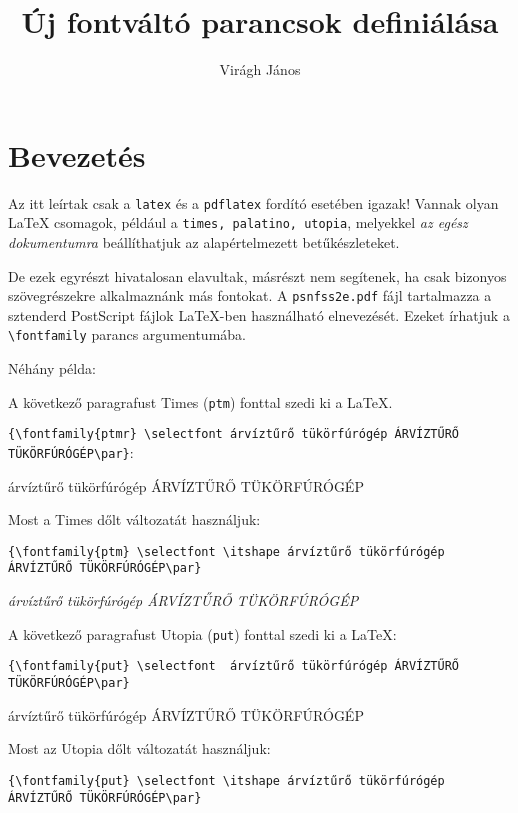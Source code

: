 \documentclass{article}
\title{Új fontváltó parancsok definiálása}
\author{Virágh János}
\begin{document}
\maketitle

\section{Bevezetés}
Az itt leírtak csak a \texttt{latex} és a \texttt{pdflatex} fordító esetében igazak! Vannak olyan \LaTeX{} csomagok, például a \texttt{times, palatino, utopia}, melyekkel \emph{az egész dokumentumra} beállíthatjuk az alapértelmezett betűkészleteket.

De ezek egyrészt hivatalosan elavultak, másrészt nem segítenek, ha csak bizonyos szövegrészekre alkalmaznánk más fontokat. 
A \texttt{psnfss2e.pdf} fájl tartalmazza a sztenderd PostScript fájlok \LaTeX-ben használható elnevezését. Ezeket írhatjuk a \verb!\fontfamily! parancs argumentumába. 

Néhány példa:

 A következő paragrafust Times (\texttt{ptm}) fonttal szedi ki a \LaTeX.

\verb!{\fontfamily{ptmr} \selectfont árvíztűrő tükörfúrógép ÁRVÍZTŰRŐ TÜKÖRFÚRÓGÉP\par}!:

{ \selectfont  árvíztűrő tükörfúrógép ÁRVÍZTŰRŐ TÜKÖRFÚRÓGÉP\par}

 Most a Times dőlt változatát használjuk:

\verb!{\fontfamily{ptm} \selectfont \itshape árvíztűrő tükörfúrógép ÁRVÍZTŰRŐ TÜKÖRFÚRÓGÉP\par}!

{ \selectfont \itshape árvíztűrő tükörfúrógép ÁRVÍZTŰRŐ TÜKÖRFÚRÓGÉP\par}

 A következő paragrafust Utopia (\texttt{put}) fonttal szedi ki a \LaTeX:
 
\verb!{\fontfamily{put} \selectfont  árvíztűrő tükörfúrógép ÁRVÍZTŰRŐ TÜKÖRFÚRÓGÉP\par}! 

{ \selectfont  árvíztűrő tükörfúrógép ÁRVÍZTŰRŐ TÜKÖRFÚRÓGÉP\par}

 Most az Utopia dőlt változatát használjuk:

\verb!{\fontfamily{put} \selectfont \itshape árvíztűrő tükörfúrógép ÁRVÍZTŰRŐ TÜKÖRFÚRÓGÉP\par}! 
\end{document}
